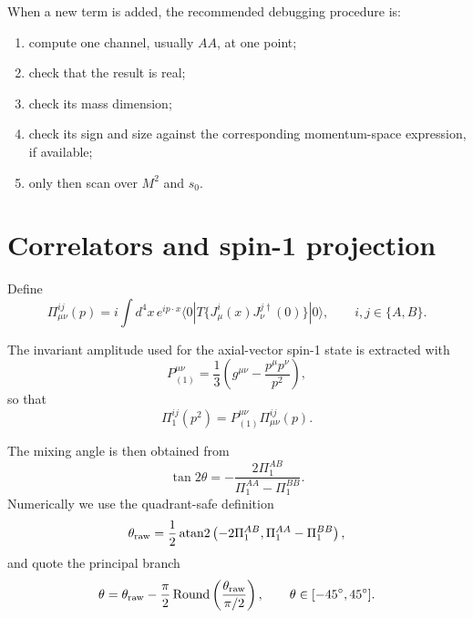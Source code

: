 \documentclass[11pt]{article}
\begin{document}
When a new term is added, the recommended debugging procedure is:
\begin{enumerate}
  \item compute one channel, usually \(AA\), at one point;
  \item check that the result is real;
  \item check its mass dimension;
  \item check its sign and size against the corresponding momentum-space
  expression, if available;
  \item only then scan over \(M^2\) and \(s_0\).
\end{enumerate}

\section{Correlators and spin-1 projection}

Define
\begin{equation}
  \Pi_{\mu\nu}^{ij}(p)
  =
  i\int d^4x\,e^{ip\cdot x}
  \langle 0 | T\{J^i_\mu(x)J^{j\dagger}_\nu(0)\}|0\rangle,
  \qquad i,j\in\{A,B\}.
\end{equation}

The invariant amplitude used for the axial-vector spin-1 state is extracted
with
\begin{equation}
  P^{\mu\nu}_{(1)}
  =
  \frac{1}{3}
  \left(
    g^{\mu\nu}
    -
    \frac{p^\mu p^\nu}{p^2}
  \right),
\end{equation}
so that
\begin{equation}
  \Pi_1^{ij}(p^2)=P^{\mu\nu}_{(1)}\Pi_{\mu\nu}^{ij}(p).
\end{equation}

The mixing angle is then obtained from
\begin{equation}
  \tan 2\theta
  =
  -\frac{2\Pi_1^{AB}}{\Pi_1^{AA}-\Pi_1^{BB}}.
\end{equation}
Numerically we use the quadrant-safe definition
\begin{equation}
  \theta_{\rm raw}
  =
  \frac{1}{2}
  \operatorname{atan2}
  \left(
    -2\Pi_1^{AB},
    \Pi_1^{AA}-\Pi_1^{BB}
  \right),
\end{equation}
and quote the principal branch
\begin{equation}
  \theta
  =
  \theta_{\rm raw}
  -
  \frac{\pi}{2}
  \operatorname{Round}
  \left(
    \frac{\theta_{\rm raw}}{\pi/2}
  \right),
  \qquad
  \theta\in[-45^\circ,45^\circ].
\end{equation}
\end{document}
